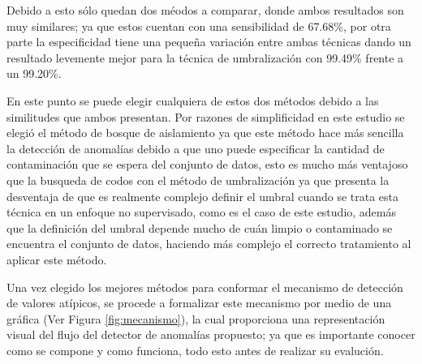 \vspace{5mm} %

Debido a esto s\'{o}lo quedan dos m\'{e}odos a comparar, donde ambos resultados son muy similares; ya que estos cuentan con una sensibilidad de 67.68\%, por otra parte la especificidad tiene una peque\~{n}a variaci\'{o}n entre ambas t\'{e}cnicas dando un resultado levemente mejor para la t\'{e}cnica de umbralizaci\'{o}n con 99.49\% frente a un 99.20\%.

\vspace{5mm} %

En este punto se puede elegir cualquiera de estos dos m\'{e}todos debido a las similitudes que ambos presentan. Por razones de simplificidad en este estudio se elegi\'{o} el m\'{e}todo de bosque de aislamiento ya que este m\'{e}todo hace m\'{a}s sencilla la detecci\'{o}n de anomal\'{i}as debido a que uno puede especificar la cantidad de contaminaci\'{o}n que se espera del conjunto de datos, esto es mucho m\'{a}s ventajoso que la busqueda de codos con el m\'{e}todo de umbralizaci\'{o}n ya que presenta la desventaja de que es realmente complejo definir el umbral cuando se trata esta t\'{e}cnica en un enfoque no supervisado, como es el caso de este estudio, adem\'{a}s que la definici\'{o}n del umbral depende mucho de cu\'{a}n limpio o contaminado se encuentra el conjunto de datos, haciendo m\'{a}s complejo el correcto tratamiento al aplicar este m\'{e}todo.

\vspace{5mm} %

Una vez elegido los mejores m\'{e}todos para conformar el mecanismo de detecci\'{o}n de valores at\'{i}picos, se procede a formalizar este mecanismo por medio de una gr\'{a}fica (Ver Figura \ref{fig:mecanismo}), la cual proporciona una representaci\'{o}n visual del flujo del detector de anomal\'{i}as propuesto; ya que es importante conocer como se compone y como funciona, todo esto antes de realizar su evaluci\'{o}n. 

